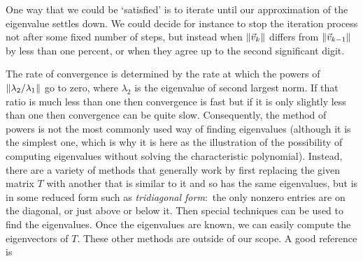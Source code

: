 One way that we could be `satisfied'
is to iterate until our approximation of the eigenvalue settles down.
We could decide for instance to stop the iteration
process not after some fixed number of steps, but instead
when $\|\vec{v}_k\|$ differs from $\|\vec{v}_{k-1}\|$ 
by less than one percent, or when they agree up to the 
second significant digit. 

The rate of convergence is determined by the rate at which 
the powers of $\|\lambda_2/\lambda_1\|$ go to zero,
where $\lambda_2$ is the eigenvalue of second largest norm. 
If that ratio is much less than one then convergence is fast but
if it is only slightly less than one then convergence can be quite slow.
Consequently, the method of powers
is not the most commonly used way of finding eigenvalues
(although it is the simplest one, which is why it is here as
the illustration of the possibility of computing eigenvalues
without solving the characteristic polynomial).
Instead, there are a variety of methods that generally work by first 
replacing the given matrix $T$ with another that is similar to it
and so has the same eigenvalues, but is in some reduced form
such as \emph{tridiagonal form}:~the only nonzero
entries are on the diagonal, or just above or below it.
Then special techniques can be used 
to find the eigenvalues.
Once the eigenvalues are known, we can easily compute 
the eigenvectors of $T$. 
These other methods  are outside of our scope.
A good reference is \cite{Goult}




